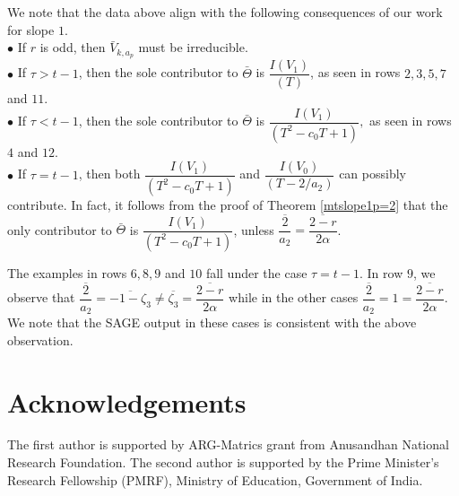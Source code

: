 \documentclass[11pt, reqno]{amsart}
\numberwithin{equation}{section}
\theoremstyle{definition}
\theoremstyle{remark}
\theoremstyle{definition}
\theoremstyle{remark}
\theoremstyle{remark}
\begin{document}
 \noindent We note that the data above align with the following consequences of our work for slope $1$.\\
  $\bullet$ If $r$ is odd, then $\bar{V}_{k,a_{p}}$ must be irreducible.\\
  $\bullet$ If $\tau>t-1$, then the sole contributor to $\bar{\Theta}$ is $\dfrac{I(V_{1})}{(T)}$, as seen in rows $2,3,5,7$ and $11$. \\
  $\bullet$ If $\tau<t-1$, then the sole contributor to $\bar{\Theta}$ is $\dfrac{I(V_{1})}{(T^2-c_{0}T+1)},$ as seen in rows $4$ and $12$.\\
  $\bullet$ If $\tau=t-1$, then both $\dfrac{I(V_{1})}{(T^2-c_{0}T+1)}$ and $\dfrac{I(V_{0})}{(T-{2}/{a_{2}})}$ can possibly contribute. In fact, it follows from the proof of Theorem \ref{mtslope1p=2} that the only contributor to $\bar{\Theta}$ is $\dfrac{I(V_{1})}{(T^2-c_{0}T+1)}$, unless $\overline{\dfrac{2}{a_{2}}} = \overline{\dfrac{2-r}{2\alpha}}$. %
  
  The examples in rows $6,8,9$ and $10$ fall under the case $\tau=t-1$. In row $9$, we observe that $\overline{\dfrac{2}{a_{2}}} = \overline{-1-\zeta_{3}} \neq  \overline{\zeta_{3}}=\overline{\dfrac{2-r}{2\alpha}}$ while in the other cases $\overline{\dfrac{2}{a_{2}}} = 1 =\overline{\dfrac{2-r}{2\alpha}}$. We note that the SAGE output in these cases is consistent with the above observation.

\section*{Acknowledgements}
 The first author is supported by ARG-Matrics grant from Anusandhan National Research Foundation. %
  The second author is supported by the Prime Minister’s Research Fellowship (PMRF), Ministry of Education, Government of India.
\end{document}
